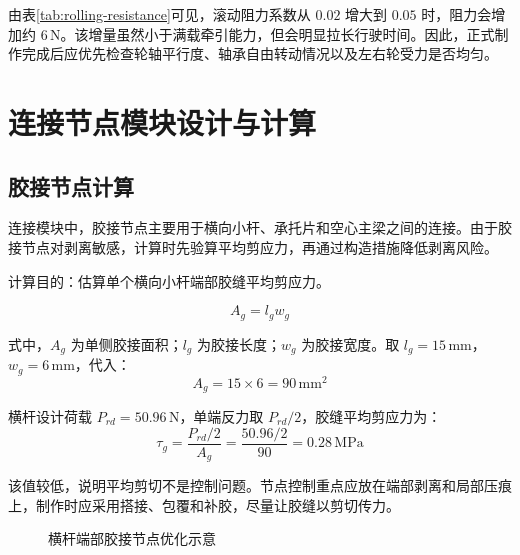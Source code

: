 \documentclass[UTF8,a4paper,12pt,fontset=none]{ctexart}
\numberwithin{equation}{section}
\numberwithin{figure}{section}
\numberwithin{table}{section}
\newcommand{\mm}{\,\mathrm{mm}}
\newcommand{\Nunit}{\,\mathrm{N}}
\newcommand{\MPa}{\,\mathrm{MPa}}
\begin{document}
由表\ref{tab:rolling-resistance}可见，滚动阻力系数从 $0.02$ 增大到 $0.05$ 时，阻力会增加约 $6\Nunit$。该增量虽然小于满载牵引能力，但会明显拉长行驶时间。因此，正式制作完成后应优先检查轮轴平行度、轴承自由转动情况以及左右轮受力是否均匀。

\newpage
\section{连接节点模块设计与计算}

\subsection{胶接节点计算}
连接模块中，胶接节点主要用于横向小杆、承托片和空心主梁之间的连接。由于胶接节点对剥离敏感，计算时先验算平均剪应力，再通过构造措施降低剥离风险。

计算目的：估算单个横向小杆端部胶缝平均剪应力。

\begin{equation}
  A_g=l_gw_g
\end{equation}

式中，$A_g$ 为单侧胶接面积；$l_g$ 为胶接长度；$w_g$ 为胶接宽度。取 $l_g=15\mm$，$w_g=6\mm$，代入：
\begin{equation}
  A_g=15\times6=90\mm^2
\end{equation}

横杆设计荷载 $P_{rd}=50.96\Nunit$，单端反力取 $P_{rd}/2$，胶缝平均剪应力为：
\begin{equation}
  \tau_g=\frac{P_{rd}/2}{A_g}=\frac{50.96/2}{90}=0.28\MPa
\end{equation}

该值较低，说明平均剪切不是控制问题。节点控制重点应放在端部剥离和局部压痕上，制作时应采用搭接、包覆和补胶，尽量让胶缝以剪切传力。

\begin{figure}[H]
\centering
{}
\caption{横杆端部胶接节点优化示意}
\label{fig:joint-peel}
\end{figure}
\end{document}
